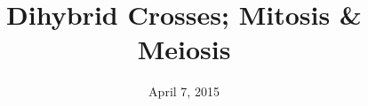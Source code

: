





\title[Dihybrid Crosses; Mitosis \& Meiosis]{Dihybrid Crosses; Mitosis \& Meiosis}
\date{April 7, 2015}



\begin{noheadline}
\maketitle
\end{noheadline}



